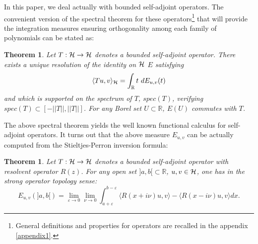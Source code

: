 \documentclass[a4paper,11pt,twoside]{article}
\numberwithin{equation}{section}
\newtheorem{theorem}[Theorem]{Theorem}
\theoremstyle{nonumberplain}
\newcounter{and}
\begin{document}
In this paper, we deal actually with bounded self-adjoint operators. The convenient version of the spectral theorem for these operators{\footnote{General definitions and properties for operators are recalled in the appendix \ref{appendix1}.}} that will provide the integration measures ensuring orthogonality among each family of polynomials can be stated as:
\begin{theorem}\label{orthop-1}
Let $T:{\cal{H}}\to{\cal{H}}$ denotes a bounded self-adjoint operator. There exists a unique resolution of the identity on ${\cal{H}} $ $E$ satisfying 
\begin{equation}
\langle Tu,v \rangle_{\cal{H}}=\int_{\mathbb{R}}t\ dE_{u,v}(t)\label{spectral-kinetic-operat}
\end{equation}
and which is supported on the spectrum of $T$, $spec(T)$, verifying $spec(T)\subset[-||T|| ,||T||]$. For any Borel set $U\subset\mathbb{R}$, $E(U)$ commutes with $T$.
\end{theorem}
The above spectral theorem yields the well known functional calculus for self-adjoint operators. It turns out that the above measure $E_{u,v}$ can be actually computed from the Stieltjes-Perron inversion formula:
\begin{theorem}\label{stieltjes-perron}
Let $T:{\cal{H}}\to{\cal{H}}$ denotes a bounded self-adjoint operator with resolvent operator $R(z)$. For any open set $]a,b[\subset\mathbb{R}$, $u,v\in\cal{H}$, one has in the strong operator topology sense:
\begin{equation}
E_{u,v}(]a,b[)=\lim_{\varepsilon\to0}\lim_{\nu\to0 }\int_{a+\varepsilon}^{b-\varepsilon}\langle R(x+i\nu)u,v \rangle-\langle R(x-i\nu)u,v \rangle dx.
\end{equation}
\end{theorem}
\end{document}
